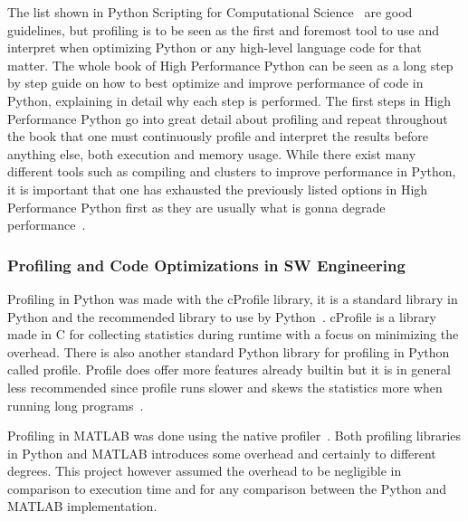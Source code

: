 \documentclass[12pt, a4paper]{article}
\begin{document}
The list shown in Python Scripting for Computational Science~\cite{pythonBook} are good guidelines, but profiling is to be seen as the first and foremost tool to use and interpret when optimizing Python or any high-level language code for that matter.
The whole book of High Performance Python can be seen as a long step by step guide on how to best optimize and improve performance of code in Python, explaining in detail why each step is performed. 
The first steps in High Performance Python go into great detail about profiling and repeat throughout the book that one must continuously profile and interpret the results before anything else, both execution and memory usage.
While there exist many different tools such as compiling and clusters to improve performance in Python, it is important that one has exhausted the previously listed options in High Performance Python first as they are usually what is gonna degrade performance~\cite{oreillyCh10}.

\subsubsection{Profiling and Code Optimizations in SW Engineering}
Profiling in Python was made with the cProfile library,
it is a standard library in Python and the recommended library to use by Python~\cite{cProfile}.
cProfile is a library made in C for collecting statistics during runtime with a focus on minimizing the overhead.
There is also another standard Python library for profiling in Python called profile.
Profile does offer more features already builtin but it is in general less recommended since profile runs slower and skews the statistics more when running long programs~\cite{cProfile}.

Profiling in MATLAB was done using the native profiler~\cite{matProfile}.
Both profiling libraries in Python and MATLAB introduces some overhead and certainly to different degrees.
This project however assumed the overhead to be negligible in comparison to execution time and for any comparison between the Python and MATLAB implementation.%
\end{document}
